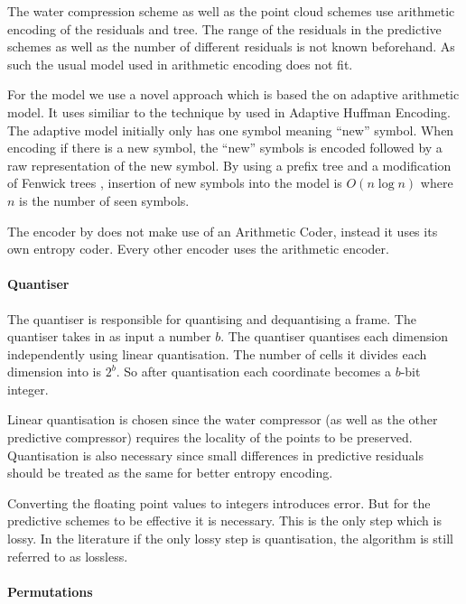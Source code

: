 \documentclass[a4paper]{report}
\begin{document}
The water compression scheme as well as the point cloud schemes use arithmetic
encoding of the residuals and tree. The range of the residuals in the
predictive schemes as well as the number of different residuals is not known
beforehand. As such the usual model used in arithmetic encoding does not
fit.

For the model we use a novel approach which is based the on adaptive
arithmetic model. It uses similiar to the technique by
\citet{cormack1984algorithms} used in Adaptive Huffman Encoding. The adaptive
model initially only has one symbol meaning ``new'' symbol. When encoding if
there is a new symbol, the ``new'' symbols is encoded followed by a raw
representation of the new symbol. By using a prefix tree and a modification of
Fenwick trees \citep{fenwick1994new}, insertion of new symbols into the model
is $O(n \log n)$ where $n$ is the number of seen symbols.

The encoder by \citet{omeltchenko2000sls} does not make use of an Arithmetic
Coder, instead it uses its own entropy coder. Every other encoder uses the
arithmetic encoder.


\paragraph{Quantiser}

The quantiser is responsible for quantising and dequantising a frame. The
quantiser takes in as input a number $b$. The quantiser quantises each
dimension independently using linear quantisation. The number of cells it
divides each dimension into is $2^b$. So after quantisation each coordinate
becomes a $b$-bit integer.

Linear quantisation is chosen since the water compressor (as well as the other
predictive compressor) requires the locality of the points to be
preserved. Quantisation is also necessary since small differences in
predictive residuals should be treated as the same for better entropy
encoding.

Converting the floating point values to integers introduces error. But for the
predictive schemes to be effective it is necessary. This is the only step
which is lossy. In the literature if the only lossy step is quantisation, the
algorithm is still referred to as lossless.


\paragraph{Permutations}
\end{document}
